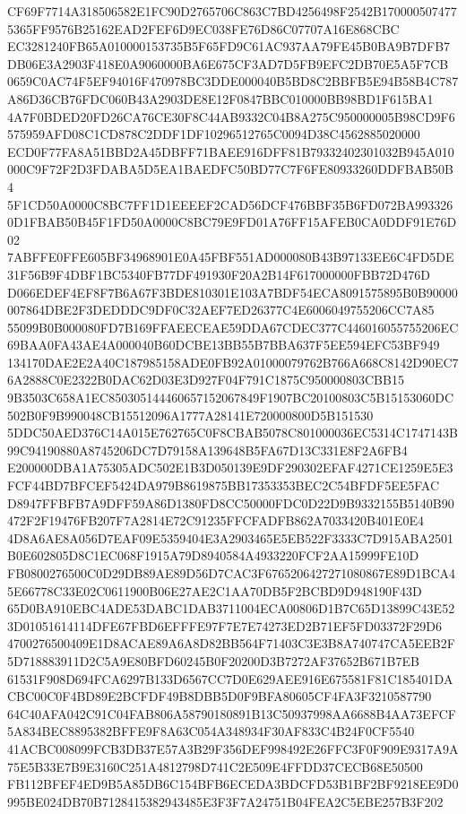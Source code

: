 \documentclass[UTF8,fontset=fandol,zihao=-4,a4paper]{ctexart}
\begin{document}
{{CF69F7714A318506582E1FC90D2765706C863C7BD4256498F2542B1700005074775365FF9576B25162EAD2FEF6D9EC038FE76D86C07707A16E868CBC
EC3281240FB65A010000153735B5F65FD9C61AC937AA79FE45B0BA9B7DFB7DB06E3A2903F418E0A9060000BA6E675CF3AD7D5FB9EFC2DB70E5A5F7CB
0659C0AC74F5EF94016F470978BC3DDE000040B5BD8C2BBFB5E94B58B4C787A86D36CB76FDC060B43A2903DE8E12F0847BBC010000BB98BD1F615BA1
4A7F0BDED20FD26CA76CE30F8C44AB9332C04B8A275C950000005B98CD9F6575959AFD08C1CD878C2DDF1DF10296512765C0094D38C4562885020000
ECD0F77FA8A51BBD2A45DBFF71BAEE916DFF81B79332402301032B945A010000C9F72F2D3FDABA5D5EA1BAEDFC50BD77C7F6FE80933260DDFBAB50B4
5F1CD50A0000C8BC7FF1D1EEEEF2CAD56DCF476BBF35B6FD072BA9933260D1FBAB50B45F1FD50A0000C8BC79E9FD01A76FF15AFEB0CA0DDF91E76D02
7ABFFE0FFE605BF34968901E0A45FBF551AD000080B43B97133EE6C4FD5DE31F56B9F4DBF1BC5340FB77DF491930F20A2B14F617000000FBB72D476D
D066EDEF4EF8F7B6A67F3BDE810301E103A7BDF54ECA8091575895B0B90000007864DBE2F3DEDDDC9DF0C32AEF7ED26377C4E6006049755206CC7A85
55099B0B000080FD7B169FFAEECEAE59DDA67CDEC377C446016055755206EC69BAA0FA43AE4A000040B60DCBE13BB55B7BBA637F5EE594EFC53BF949
134170DAE2E2A40C187985158ADE0FB92A01000079762B766A668C8142D90EC76A2888C0E2322B0DAC62D03E3D927F04F791C1875C950000803CBB15
9B3503C658A1EC850305144460657152067849F1907BC20100803C5B15153060DC502B0F9B990048CB15512096A1777A28141E720000800D5B151530
5DDC50AED376C14A015E762765C0F8CBAB5078C801000036EC5314C1747143B99C94190880A8745206DC7D79158A139648B5FA67D13C331E8F2A6FB4
E200000DBA1A75305ADC502E1B3D050139E9DF290302EFAF4271CE1259E5E3FCF44BD7BFCEF5424DA979B8619875BB17353353BEC2C54BFDF5EE5FAC
D8947FFBFB7A9DFF59A86D1380FD8CC50000FDC0D22D9B9332155B5140B90472F2F19476FB207F7A2814E72C91235FFCFADFB862A7033420B401E0E4
4D8A6AE8A056D7EAF09E5359404E3A2903465E5EB522F3333C7D915ABA2501B0E602805D8C1EC068F1915A79D8940584A4933220FCF2AA15999FE10D
FB0800276500C0D29DB89AE89D56D7CAC3F6765206427271080867E89D1BCA45E66778C33E02C0611900B06E27AE2C1AA70DB5F2BCBD9D948190F43D
65D0BA910EBC4ADE53DABC1DAB3711004ECA00806D1B7C65D13899C43E523D01051614114DFE67FBD6EFFFE97F7E7E74273ED2B71EF5FD03372F29D6
4700276500409E1D8ACAE89A6A8D82BB564F71403C3E3B8A740747CA5EEB2F5D718883911D2C5A9E80BFD60245B0F20200D3B7272AF37652B671B7EB
61531F908D694FCA6297B133D6567CC7D0E629AEE916E675581F81C185401DACBC00C0F4BD89E2BCFDF49B8DBB5D0F9BFA80605CF4FA3F3210587790
64C40AFA042C91C04FAB806A58790180891B13C50937998AA6688B4AA73EFCF5A834BEC8895382BFFE9F8A63C054A348934F30AF833C4B24F0CF5540
41ACBC008099FCB3DB37E57A3B29F356DEF998492E26FFC3F0F909E9317A9A75E5B33E7B9E3160C251A4812798D741C2E509E4FFDD37CECB68E50500
FB112BFEF4ED9B5A85DB6C154BFB6ECEDA3BDCFD53B1BF2BF9218EE9D0995BE024DB70B7128415382943485E3F3F7A24751B04FEA2C5EBE257B3F202
}}
\end{document}
